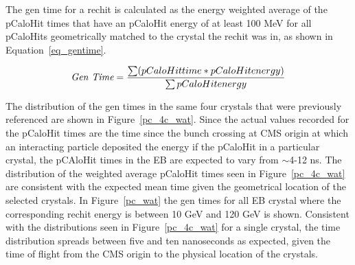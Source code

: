 

The gen time for a rechit is calculated as the energy weighted average of the pCaloHit times that have an pCaloHit energy of at least 100 MeV for all pCaloHits geometrically matched to the crystal the rechit was in, as shown in Equation~\ref{eq_gentime}.

\begin{equation} 
\emph{Gen Time} = \frac{\sum( pCaloHit time * pCaloHit energy )}{\sum pCaloHit energy }
\label{eq_gentime}
\end{equation}

The distribution of the gen times in the same four crystals that were previously referenced are shown in Figure~\ref{pc_4c_wat}. Since the actual values recorded for the pCaloHit times are the time since the bunch crossing at CMS origin at which an interacting particle deposited the energy if the pCaloHit in a particular crystal, the pCAloHit times in the EB are expected to vary from $\sim$4-12 ns. The distribution of the weighted average pCaloHit times seen in Figure~\ref{pc_4c_wat} are consistent with the expected mean time given the geometrical location of the selected crystals. In Figure~\ref{pc_wat} the gen times for all EB crystal where the corresponding rechit energy is between 10 GeV and 120 GeV is shown. Consistent with the distributions seen in Figure~\ref{pc_4c_wat} for a single crystal, the time distribution spreads between five and ten nanoseconds as expected, given the time of flight from the CMS origin to the physical location of the crystals.


